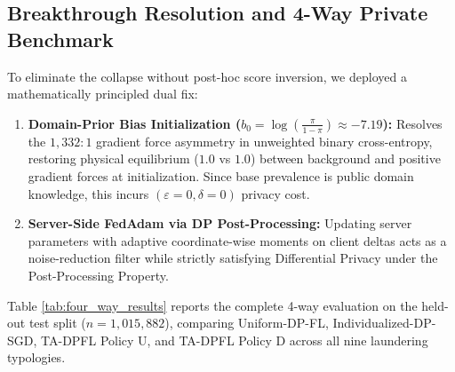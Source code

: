\documentclass[conference]{IEEEtran}
\begin{document}
\subsection{Breakthrough Resolution and 4-Way Private Benchmark}
To eliminate the collapse without post-hoc score inversion, we deployed a mathematically principled dual fix:
\begin{enumerate}
    \item \textbf{Domain-Prior Bias Initialization ($b_0 = \log(\frac{\pi}{1-\pi}) \approx -7.19$):} Resolves the $1,332:1$ gradient force asymmetry in unweighted binary cross-entropy, restoring physical equilibrium ($1.0$ vs $1.0$) between background and positive gradient forces at initialization. Since base prevalence is public domain knowledge, this incurs $(\varepsilon = 0, \delta = 0)$ privacy cost.
    \item \textbf{Server-Side FedAdam via DP Post-Processing:} Updating server parameters with adaptive coordinate-wise moments on client deltas acts as a noise-reduction filter while strictly satisfying Differential Privacy under the Post-Processing Property.
\end{enumerate}

Table \ref{tab:four_way_results} reports the complete 4-way evaluation on the held-out test split ($n = 1,015,882$), comparing Uniform-DP-FL, Individualized-DP-SGD, TA-DPFL Policy U, and TA-DPFL Policy D across all nine laundering typologies.
\end{document}
